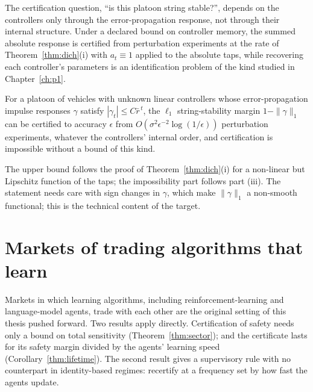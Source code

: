 The certification question, ``is this platoon string stable?'', depends on the controllers only through the error-propagation response, not through their internal structure. Under a declared bound on controller memory, the summed absolute response is certified from perturbation experiments at the rate of Theorem~\ref{thm:dich}(i) with $a_t\equiv1$ applied to the absolute taps, while recovering each controller's parameters is an identification problem of the kind studied in Chapter~\ref{ch:p1}.

\begin{proposition}\label{prop:platoon}
For a platoon of vehicles with unknown linear controllers whose error-propagation impulse responses $\gamma$ satisfy $|\gamma_t|\le C\bar r^{\,t}$, the $\ell_1$ string-stability margin $1-\|\gamma\|_1$ can be certified to accuracy $\epsilon$ from $O(\sigma^2\epsilon^{-2}\log(1/\epsilon))$ perturbation experiments, whatever the controllers' internal order, and certification is impossible without a bound of this kind. \hfill\Target
\end{proposition}

The upper bound follows the proof of Theorem~\ref{thm:dich}(i) for a non-linear but Lipschitz function of the taps; the impossibility part follows part (iii). The statement needs care with sign changes in $\gamma$, which make $\|\gamma\|_1$ a non-smooth functional; this is the technical content of the target.


\section{Markets of trading algorithms that learn}\label{sec:bm_ai}

Markets in which learning algorithms, including reinforcement-learning and language-model agents, trade with each other are the original setting of this thesis pushed forward. Two results apply directly. Certification of safety needs only a bound on total sensitivity (Theorem~\ref{thm:sector}); and the certificate lasts for its safety margin divided by the agents' learning speed (Corollary~\ref{thm:lifetime}). The second result gives a supervisory rule with no counterpart in identity-based regimes: recertify at a frequency set by how fast the agents update.

